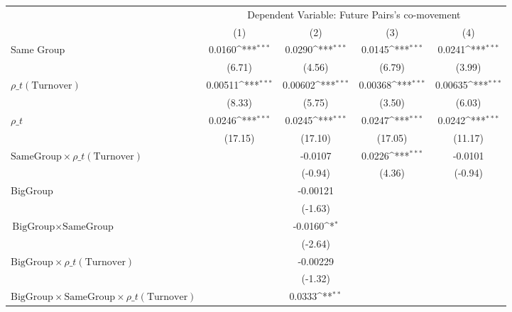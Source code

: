 {
\def\sym#1{\ifmmode^{#1}\else\(^{#1}\)\fi}
\begin{tabular}{l*{4}{c}}
\hline\hline
                &\multicolumn{4}{c}{Dependent Variable: Future Pairs's co-movement}         \\\cmidrule(lr){2-5}
                &\multicolumn{1}{c}{(1)}         &\multicolumn{1}{c}{(2)}         &\multicolumn{1}{c}{(3)}         &\multicolumn{1}{c}{(4)}         \\
\hline
Same Group      &   0.0160\sym{***}&   0.0290\sym{***}&   0.0145\sym{***}&   0.0241\sym{***}\\
                &   (6.71)         &   (4.56)         &   (6.79)         &   (3.99)         \\
[1em]
 $ {\rho\_t(\text{Turnover})} $ &  0.00511\sym{***}&  0.00602\sym{***}&  0.00368\sym{***}&  0.00635\sym{***}\\
                &   (8.33)         &   (5.75)         &   (3.50)         &   (6.03)         \\
[1em]
 $ {\rho\_t} $   &   0.0246\sym{***}&   0.0245\sym{***}&   0.0247\sym{***}&   0.0242\sym{***}\\
                &  (17.15)         &  (17.10)         &  (17.05)         &  (11.17)         \\
[1em]
$ {\text{SameGroup} \times  {\rho\_t(\text{Turnover})} } $ &                  &  -0.0107         &   0.0226\sym{***}&  -0.0101         \\
                &                  &  (-0.94)         &   (4.36)         &  (-0.94)         \\
[1em]
BigGroup        &                  & -0.00121         &                  &                  \\
                &                  &  (-1.63)         &                  &                  \\
[1em]
$ {\text{BigGroup} } \times {\text{SameGroup} }  $ &                  &  -0.0160\sym{*}  &                  &                  \\
                &                  &  (-2.64)         &                  &                  \\
[1em]
$ {\text{BigGroup} } \times  {\rho\_t(\text{Turnover})}  $ &                  & -0.00229         &                  &                  \\
                &                  &  (-1.32)         &                  &                  \\
[1em]
$ {\text{BigGroup}}\times{\text{SameGroup}}\times  {\rho\_t(\text{Turnover})}$ &                  &   0.0333\sym{**} &                  &                  \\

\end{tabular}}
